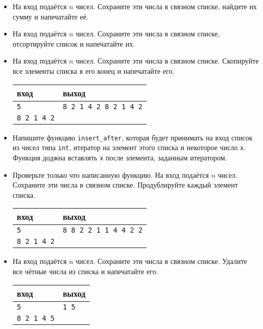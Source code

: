 \documentclass{article}
\begin{document}
\begin{itemize}
\item На вход подаётся $n$ чисел. Сохраните эти числа в связном списке, найдите их сумму и напечатайте её.
\item На вход подаётся $n$ чисел. Сохраните эти числа в связном списке, отсортируйте список и напечатайте их.

\item На вход подаётся $n$ чисел. Сохраните эти числа в связном списке. Скопируйте все элементы списка в его конец и напечатайте его.
\begin{center}
\begin{tabular}{ l | l }
 вход & выход \\ \hline
 \texttt{5} & \texttt{8 2 1 4 2 8 2 1 4 2}  \\ 
 \texttt{8 2 1 4 2} &  \\
\end{tabular}
\end{center}

\item Напишите функцию \texttt{insert\_after}, которая будет принимать на вход список из чисел типа \texttt{int}, итератор на элемент этого списка и некоторое число \texttt{x}. Функция доджна вставлять \texttt{x} после элемента, заданным итератором.

\item Проверьте только что написанную функцию. На вход подаётся $n$ чисел. Сохраните эти числа в связном списке. Продублируйте каждый элемент списка.
\begin{center}
\begin{tabular}{ l | l }
 вход & выход \\ \hline
 \texttt{5} & \texttt{8 8 2 2 1 1 4 4 2 2}  \\ 
 \texttt{8 2 1 4 2} &  \\
\end{tabular}
\end{center}

\item На вход подаётся $n$ чисел. Сохраните эти числа в связном списке. Удалите все чётные числа из списка и напечатайте его.
\begin{center}
\begin{tabular}{ l | l }
 вход & выход \\ \hline
 \texttt{5} & \texttt{1 5}  \\ 
 \texttt{8 2 1 4 5} &  \\
\end{tabular}
\end{center}

\end{itemize}


\newpage
\end{document}
